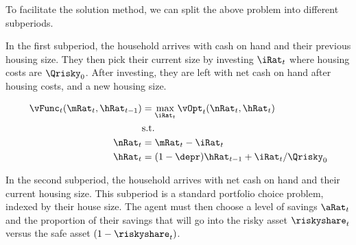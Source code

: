 \documentclass[PortfolioChoiceWithRiskyHousing]{subfiles}
\begin{document}
%

To facilitate the solution method, we can split the above problem into different subperiods.

In the first subperiod, the household arrives with cash on hand and their previous housing size. They then pick their current size by investing $\iRat_{t}$ where housing costs are $\Qrisky_0$. After investing, they are left with net cash on hand after housing costs, and a new housing size.

\begin{equation}
	\begin{split}
		\vFunc_{t}(\mRat_{t}, \hRat_{t-1}) & = \max_{\iRat_{t}} \vOpt_{t}(\nRat_{t}, \hRat_{t}) \\
		& \text{s.t.} \\
		\nRat_{t} & = \mRat_{t} - \iRat_{t} \\
		\hRat_{t} & = (1-\depr)\hRat_{t-1} + \iRat_{t}/\Qrisky_0
	\end{split}
\end{equation}

In the second subperiod, the household arrives with net cash on hand and their current housing size. This subperiod is a standard portfolio choice problem, indexed by their house size. The agent must then choose a level of savings $\aRat_{t}$ and the proportion of their savings that will go into the risky asset $\riskyshare_{t}$ versus the safe asset $(1-\riskyshare_{t})$.
\end{document}
